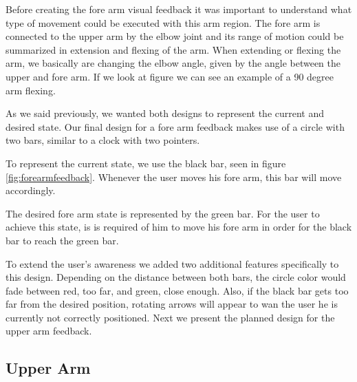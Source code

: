 Before creating the fore arm visual feedback it was important to understand what type of movement could be executed with this arm region.
The fore arm is connected to the upper arm by the elbow joint and its range of motion could be summarized in extension and flexing of the arm.
When extending or flexing the arm, we basically are changing the elbow angle, given by the angle between the upper and fore arm.
If we look at figure  we can see an example of a 90 degree arm flexing.

As we said previously, we wanted both designs to represent the current and desired state. Our final design for a fore arm feedback makes use of a circle with two bars, similar to a clock with two pointers.


To represent the current state, we use the black bar, seen in figure \ref{fig:forearmfeedback}. Whenever the user moves his fore arm, this bar will move accordingly.


The desired fore arm state is represented by the green bar. For the user to achieve this state, is is required of him to move his fore arm in order for the black bar to reach the green bar.


To extend the user's awareness we added two additional features specifically to this design. Depending on the distance between both bars, the circle color would fade between red, too far, and green, close enough. Also, if the black bar gets too far from the desired position, rotating arrows will appear to wan the user he is currently not correctly positioned. Next we present the planned design for the upper arm feedback.


\subsection{Upper Arm}

